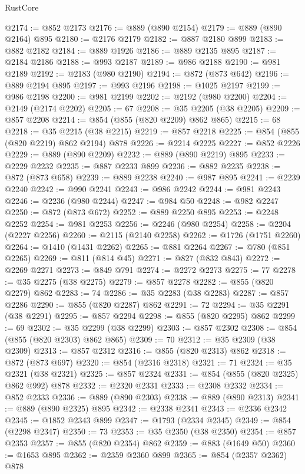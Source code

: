 \begin{lexlean}{RustCore}
\begin{coremodule}
@2174 := @852 @2173
@2176 := @889 (@890 @2154)
@2179 := @889 (@890 @2164) @895
@2180 := @2176 @2179
@2182 := @887 @2180 @899
@2183 := @882 @2182
@2184 := @889 @1926
@2186 := @889 @2135 @895
@2187 := @2184 @2186
@2188 := @993 @2187
@2189 := @986 @2188
@2190 := @981 @2189
@2192 := @2183 (@980 @2190)
@2194 := @872 (@873 @642)
@2196 := @889 @2194 @895
@2197 := @993 @2196
@2198 := @1025 @2197
@2199 := @986 @2198
@2200 := @981 @2199
@2202 := @2192 (@980 @2200)
@2204 := @2149 (@2174 @2202)
@2205 := 67
@2208 := @35 @2205 (@38 @2205)
@2209 := @857 @2208
@2214 := @854 (@855 (@820 @2209) @862 @865)
@2215 := 68
@2218 := @35 @2215 (@38 @2215)
@2219 := @857 @2218
@2225 := @854 (@855 (@820 @2219) @862 @2194) @878
@2226 := @2214 @2225
@2227 := @852 @2226
@2229 := @889 (@890 @2209)
@2232 := @889 (@890 @2219) @895
@2233 := @2229 @2232
@2235 := @887 @2233 @899
@2236 := @882 @2235
@2238 := @872 (@873 @658)
@2239 := @889 @2238
@2240 := @987 @895
@2241 := @2239 @2240
@2242 := @990 @2241
@2243 := @986 @2242
@2244 := @981 @2243
@2246 := @2236 (@980 @2244)
@2247 := @984 @50
@2248 := @982 @2247
@2250 := @872 (@873 @672)
@2252 := @889 @2250 @895
@2253 := @2248 @2252
@2254 := @981 @2253
@2256 := @2246 (@980 @2254)
@2258 := @2204 (@2227 @2256)
@2260 := @2115 (@2140 @2258)
@2262 := @1726 (@1751 @2260)
@2264 := @1410 (@1431 @2262)
@2265 := @881 @2264
@2267 := @780 (@851 @2265)
@2269 := @811 (@814 @45)
@2271 := @827 (@832 @843)
@2272 := @2269 @2271
@2273 := @849 @791
@2274 := @2272 @2273
@2275 := 77
@2278 := @35 @2275 (@38 @2275)
@2279 := @857 @2278
@2282 := @855 (@820 @2279) @862
@2283 := 74
@2286 := @35 @2283 (@38 @2283)
@2287 := @857 @2286
@2290 := @855 (@820 @2287) @862
@2291 := 72
@2294 := @35 @2291 (@38 @2291)
@2295 := @857 @2294
@2298 := @855 (@820 @2295) @862
@2299 := 69
@2302 := @35 @2299 (@38 @2299)
@2303 := @857 @2302
@2308 := @854 (@855 (@820 @2303) @862 @865)
@2309 := 70
@2312 := @35 @2309 (@38 @2309)
@2313 := @857 @2312
@2316 := @855 (@820 @2313) @862
@2318 := @872 (@873 @697)
@2320 := @854 (@2316 @2318)
@2321 := 71
@2324 := @35 @2321 (@38 @2321)
@2325 := @857 @2324
@2331 := @854 (@855 (@820 @2325) @862 @992) @878
@2332 := @2320 @2331
@2333 := @2308 @2332
@2334 := @852 @2333
@2336 := @889 (@890 @2303)
@2338 := @889 (@890 @2313)
@2341 := @889 (@890 @2325) @895
@2342 := @2338 @2341
@2343 := @2336 @2342
@2345 := @1852 @2343 @899
@2347 := @1793 (@2334 @2345)
@2349 := @854 (@2298 @2347)
@2350 := 73
@2353 := @35 @2350 (@38 @2350)
@2354 := @857 @2353
@2357 := @855 (@820 @2354) @862
@2359 := @883 (@1649 @50)
@2360 := @1653 @895
@2362 := @2359 @2360 @899
@2365 := @854 (@2357 @2362) @878

\end{coremodule}
\end{lexlean}

